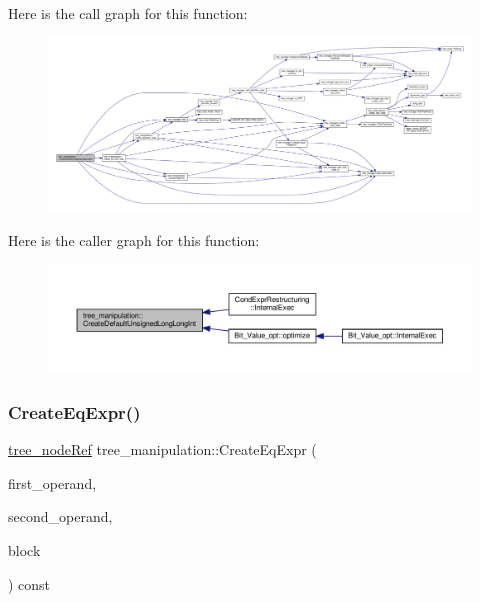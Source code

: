 Here is the call graph for this function\+:
\nopagebreak
\begin{figure}[H]
\begin{center}
\leavevmode
\includegraphics[width=350pt]{d0/d99/classtree__manipulation_a2b3e55fe3231ec58b1fc19b969e25166_cgraph}
\end{center}
\end{figure}
Here is the caller graph for this function\+:
\nopagebreak
\begin{figure}[H]
\begin{center}
\leavevmode
\includegraphics[width=350pt]{d0/d99/classtree__manipulation_a2b3e55fe3231ec58b1fc19b969e25166_icgraph}
\end{center}
\end{figure}
\mbox{\label{classtree__manipulation_ac281a55ffae027aa28a23101c0a65d2d}} 
\subsubsection{\texorpdfstring{Create\+Eq\+Expr()}{CreateEqExpr()}}
{\footnotesize\ttfamily \hyperlink{tree__node_8hpp_a6ee377554d1c4871ad66a337eaa67fd5}{tree\+\_\+node\+Ref} tree\+\_\+manipulation\+::\+Create\+Eq\+Expr (\begin{DoxyParamCaption}\item[{const \hyperlink{tree__node_8hpp_a3cf5d02292c940f3892425a5b5fdec3c}{tree\+\_\+node\+Const\+Ref} \&}]{first\+\_\+operand,  }\item[{const \hyperlink{tree__node_8hpp_a3cf5d02292c940f3892425a5b5fdec3c}{tree\+\_\+node\+Const\+Ref} \&}]{second\+\_\+operand,  }\item[{const bloc\+Ref \&}]{block }\end{DoxyParamCaption}) const}



